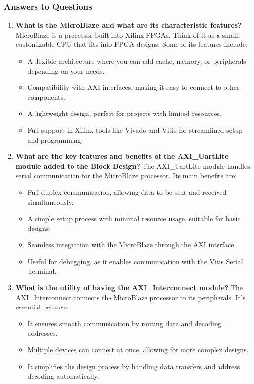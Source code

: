 \subsubsection{Answers to Questions}
\begin{enumerate}
    \item \textbf{What is the MicroBlaze and what are its characteristic features?}
    MicroBlaze is a processor built into Xilinx FPGAs. Think of it as a small, customizable CPU that fits into FPGA designs. Some of its features include:
    \begin{itemize}
        \item A flexible architecture where you can add cache, memory, or peripherals depending on your needs.
        \item Compatibility with AXI interfaces, making it easy to connect to other components.
        \item A lightweight design, perfect for projects with limited resources.
        \item Full support in Xilinx tools like Vivado and Vitis for streamlined setup and programming.
    \end{itemize}
    
    \item \textbf{What are the key features and benefits of the AXI\_UartLite module added to the Block Design?}
    The AXI\_UartLite module handles serial communication for the MicroBlaze processor. Its main benefits are:
    \begin{itemize}
        \item Full-duplex communication, allowing data to be sent and received simultaneously.
        \item A simple setup process with minimal resource usage, suitable for basic designs.
        \item Seamless integration with the MicroBlaze through the AXI interface.
        \item Useful for debugging, as it enables communication with the Vitis Serial Terminal.
    \end{itemize}
    
    \item \textbf{What is the utility of having the AXI\_Interconnect module?}
    The AXI\_Interconnect connects the MicroBlaze processor to its peripherals. It’s essential because:
    \begin{itemize}
        \item It ensures smooth communication by routing data and decoding addresses.
        \item Multiple devices can connect at once, allowing for more complex designs.
        \item It simplifies the design process by handling data transfers and address decoding automatically.
    \end{itemize}
\end{enumerate}


